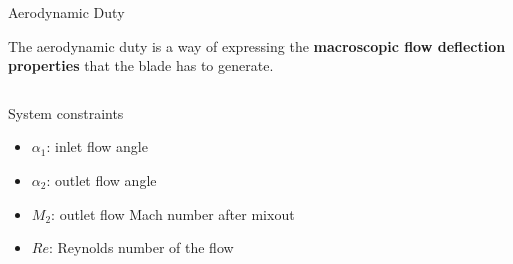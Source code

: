 \begin{frame}{Aerodynamic Duty}

    The aerodynamic duty is a way of expressing the \textbf{macroscopic flow deflection properties} that the blade has to generate.

    \begin{columns}
        \vspace{0.5cm}
        \begin{block}{System constraints}
            \begin{itemize}
                \setlength\itemsep{0.3cm}
                \item $\alpha_1$: inlet flow angle
                \item $\alpha_2$: outlet flow angle
                \item $M_2$: outlet flow Mach number after mixout
                \item $Re$: Reynolds number of the flow
            \end{itemize}
        \end{block}
            \vspace{-0.5cm}
            
    \end{columns}
    
\end{frame}